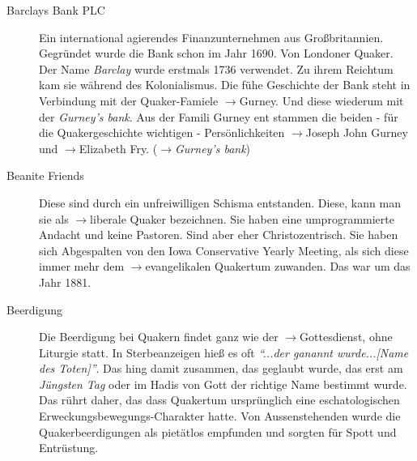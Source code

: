 \begin{description}
 \item[Barclays Bank PLC] Ein international agierendes Finanzunternehmen aus
Großbritannien. Gegründet wurde die Bank schon im Jahr 1690. Von Londoner
Quaker. Der Name \textit{Barclay} wurde erstmals 1736 verwendet. Zu ihrem
Reichtum kam sie während des Kolonialismus. Die fühe Geschichte der Bank steht
in Verbindung mit der Quaker-Famiele $\to$Gurney. Und diese wiederum mit der
\textit{Gurney's bank}. Aus der Famili  Gurney ent stammen die beiden - für die
Quakergeschichte wichtigen - Persönlichkeiten $\to$Joseph John Gurney und
$\to$Elizabeth Fry. ($\to$\textit{Gurney's bank})

 \item[Beanite Friends]
 Diese sind durch ein unfreiwilligen Schisma entstanden. Diese, kann man sie als
$\to$liberale Quaker bezeichnen. Sie haben eine umprogrammierte Andacht und
keine Pastoren. Sind aber eher Christozentrisch. Sie haben sich Abgespalten von
den Iowa Conservative Yearly Meeting, als sich diese immer mehr dem
$\to$evangelikalen Quakertum zuwanden. Das war um das Jahr 1881.
  


 \item[Beerdigung] Die Beerdigung bei Quakern findet ganz wie der
$\to$Gottesdienst, ohne Liturgie statt. In Sterbeanzeigen hieß es oft
\textit{"`...der ganannt wurde...[Name des Toten]"'}. Das hing damit zusammen,
das geglaubt wurde, das erst am \textit{Jüngsten Tag} oder im Hadis von Gott der
richtige Name bestimmt wurde. Das rührt daher, das dass Quakertum ursprünglich
eine eschatologischen Erweckungsbewegungs-Charakter hatte. Von Aussenstehenden
wurde die Quakerbeerdigungen als pietätlos empfunden und sorgten für Spott und
Entrüstung.  


\end{description}
